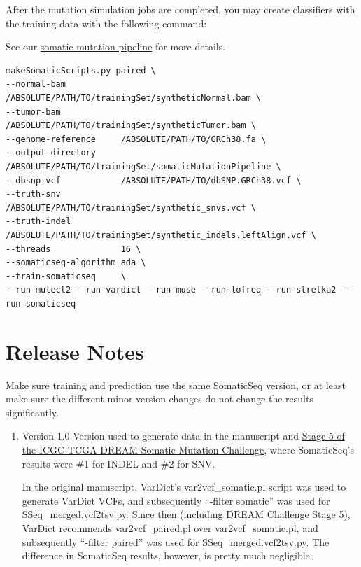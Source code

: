\documentclass[10pt,letterpaper]{article}
\begin{document}
\begin{sloppypar}
After the mutation simulation jobs are completed, you may create classifiers with the training data with the following command:

See our \href{https://github.com/bioinform/somaticseq/blob/master/utilities/dockered_pipelines}{somatic mutation pipeline} for more details.

\begin{lstlisting}
makeSomaticScripts.py paired \
--normal-bam           /ABSOLUTE/PATH/TO/trainingSet/syntheticNormal.bam \
--tumor-bam            /ABSOLUTE/PATH/TO/trainingSet/syntheticTumor.bam \
--genome-reference     /ABSOLUTE/PATH/TO/GRCh38.fa \
--output-directory     /ABSOLUTE/PATH/TO/trainingSet/somaticMutationPipeline \
--dbsnp-vcf            /ABSOLUTE/PATH/TO/dbSNP.GRCh38.vcf \
--truth-snv            /ABSOLUTE/PATH/TO/trainingSet/synthetic_snvs.vcf \
--truth-indel          /ABSOLUTE/PATH/TO/trainingSet/synthetic_indels.leftAlign.vcf \
--threads              16 \
--somaticseq-algorithm ada \
--train-somaticseq     \
--run-mutect2 --run-vardict --run-muse --run-lofreq --run-strelka2 --run-somaticseq
\end{lstlisting}





\section{Release Notes}

Make sure training and prediction use the same SomaticSeq version, or at least make sure the different minor version changes do not change the results significantly. 


\begin{enumerate}


    \item Version 1.0
    Version used to generate data in the manuscript and \href{https://www.synapse.org/#!Synapse:syn312572/wiki/72943}{Stage 5 of the ICGC-TCGA DREAM Somatic Mutation Challenge}, where SomaticSeq's results were \#1 for INDEL and \#2 for SNV. 

    In the original manuscript, VarDict's var2vcf\_somatic.pl script was used to generate VarDict VCFs, and subsequently ``-filter somatic'' was used for SSeq\_merged.vcf2tsv.py. Since then (including DREAM Challenge Stage 5), VarDict recommends var2vcf\_paired.pl over var2vcf\_somatic.pl, and subsequently ``-filter paired'' was used for SSeq\_merged.vcf2tsv.py. The difference in SomaticSeq results, however, is pretty much negligible. 


\end{enumerate}
\end{sloppypar}
\end{document}
